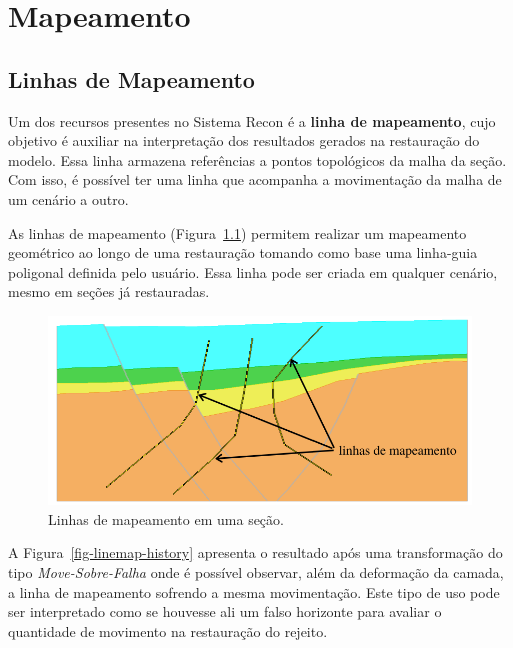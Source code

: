 
\chapter{Mapeamento}

\section{Linhas de Mapeamento}

Um dos recursos presentes no Sistema Recon é a \textbf{linha de mapeamento}, cujo objetivo é auxiliar na interpretação dos resultados gerados na restauração do modelo. Essa linha armazena referências a pontos topológicos da malha da seção. Com isso, é possível ter uma linha que acompanha a movimentação da malha de um cenário a outro.

As linhas de mapeamento (Figura~\ref{fig-linemap}) permitem realizar um mapeamento geométrico ao longo de uma restauração tomando como base uma linha-guia poligonal definida pelo usuário. Essa linha pode ser criada em qualquer cenário, mesmo em seções já restauradas.

\begin{figure} [h]
  \begin{center}
    \includegraphics[width=400pt]{images/fig-linhas-de-mapeamento-ed}
    \caption{Linhas de mapeamento em uma seção.}\label{fig-linemap}
  \end{center}
\end{figure}

A Figura~\ref{fig-linemap-history} apresenta o resultado após uma transformação do tipo \textit{Move-Sobre-Falha} onde é possível observar, além da deformação da camada, a linha de mapeamento sofrendo a mesma movimentação. Este tipo de uso pode ser interpretado como se houvesse ali um falso horizonte para avaliar o quantidade de movimento na restauração do rejeito.

